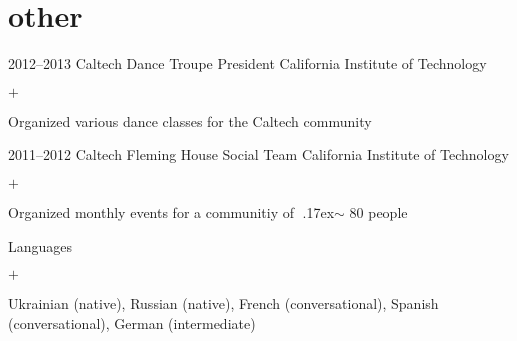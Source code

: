 \documentclass[]{luger-cv} %
\begin{document}
\ifdefined \onepage \else
{}
\fi


\ifdefined \withother

    \section{other}
    \begin{entrylist}


    \entry
    {2012--2013}
    {Caltech Dance Troupe President}
    {California Institute of Technology}
    {%
    \vspace{-1em}
    \begin{list}{$+$}{\cvlist}
    \item Organized various dance classes for the Caltech community
    \end{list}
    }


    \entry
    {2011--2012}
    {Caltech Fleming House Social Team}
    {California Institute of Technology}
    {%
    \vspace{-1em}
    \begin{list}{$+$}{\cvlist}
    \item Organized monthly events for a communitiy of {\raise.17ex\hbox{$\scriptstyle\sim$}} 80 people
    \end{list}
    }


    \entry
    {}
    {Languages}
    {}
    {%
    \vspace{-1em}
    \begin{list}{$+$}{\cvlist}
    \item Ukrainian (native), Russian (native), French (conversational), Spanish (conversational), German (intermediate)
    \end{list}
    }


    \end{entrylist}
\fi
\end{document}
